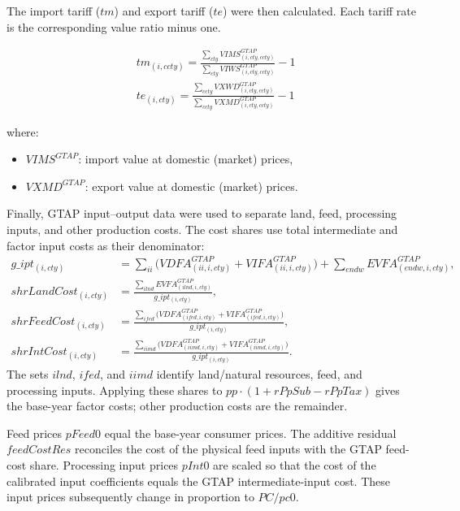 \bigskip

The import tariff (\( tm \)) and export tariff (\( te \)) were then calculated.
Each tariff rate is the corresponding value ratio minus one.

\begin{align}
&tm_{(i,ccty)} =
\frac{\sum_{cty} VIMS^{GTAP}_{(i,cty,ccty)}}{\sum_{cty} VIWS^{GTAP}_{(i,cty,ccty)}} - 1 \\
&te_{(i,cty)} =
\frac{\sum_{ccty} VXWD^{GTAP}_{(i,cty,ccty)}}{\sum_{ccty} VXMD^{GTAP}_{(i,cty,ccty)}} - 1
\end{align}

where:
\begin{itemize}
\item \( VIMS^{GTAP} \): import value at domestic (market) prices,  
\item \( VXMD^{GTAP} \): export value at domestic (market) prices.
\end{itemize}

\bigskip

Finally, GTAP input--output data were used to separate land, feed, processing inputs, and other production costs. The cost shares use total intermediate and factor input costs as their denominator:
\begin{align}
g\_ipt_{(i,cty)}
&=\sum_{ii}\bigl(VDFA^{GTAP}_{(ii,i,cty)}+VIFA^{GTAP}_{(ii,i,cty)}\bigr)
+\sum_{endw}EVFA^{GTAP}_{(endw,i,cty)},\\
shrLandCost_{(i,cty)}
&=\frac{\sum_{ilnd}EVFA^{GTAP}_{(ilnd,i,cty)}}{g\_ipt_{(i,cty)}},\\
shrFeedCost_{(i,cty)}
&=\frac{\sum_{ifed}\bigl(VDFA^{GTAP}_{(ifed,i,cty)}+VIFA^{GTAP}_{(ifed,i,cty)}\bigr)}{g\_ipt_{(i,cty)}},\\
shrIntCost_{(i,cty)}
&=\frac{\sum_{iimd}\bigl(VDFA^{GTAP}_{(iimd,i,cty)}+VIFA^{GTAP}_{(iimd,i,cty)}\bigr)}{g\_ipt_{(i,cty)}}.
\end{align}
The sets \(ilnd\), \(ifed\), and \(iimd\) identify land/natural resources, feed, and processing inputs. Applying these shares to \(pp\cdot(1+rPpSub-rPpTax)\) gives the base-year factor costs; other production costs are the remainder.

Feed prices \(pFeed0\) equal the base-year consumer prices. The additive residual \(feedCostRes\) reconciles the cost of the physical feed inputs with the GTAP feed-cost share. Processing input prices \(pInt0\) are scaled so that the cost of the calibrated input coefficients equals the GTAP intermediate-input cost. These input prices subsequently change in proportion to \(PC/pc0\).
